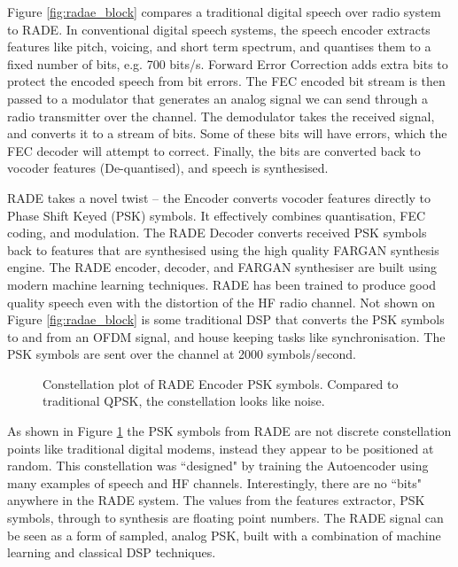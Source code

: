 \documentclass{article}
\begin{document}
Figure \ref{fig:radae_block} compares a traditional digital speech over radio system to RADE.
In conventional digital speech systems, the speech encoder extracts features like pitch, voicing, and short term spectrum, and quantises them to a fixed number of bits, e.g. 700 bits/s.  Forward Error Correction adds extra bits to protect the encoded speech from bit errors.  The FEC encoded bit stream is then passed to a modulator that generates an analog signal we can send through a radio transmitter over the channel.  The demodulator takes the received signal, and converts it to a stream of bits.  Some of these bits will have errors, which the FEC decoder will attempt to correct.  Finally, the bits are converted back to vocoder features (De-quantised), and speech is synthesised.

RADE takes a novel twist – the Encoder converts vocoder features directly to Phase Shift Keyed (PSK) symbols. It effectively combines quantisation, FEC coding, and modulation.  The RADE Decoder converts received PSK symbols back to features that are synthesised using the high quality FARGAN synthesis engine. The RADE encoder, decoder, and FARGAN synthesiser are built using modern machine learning techniques.  RADE has been trained to produce good quality speech even with the distortion of the HF radio channel. Not shown on Figure \ref{fig:radae_block} is some traditional DSP that converts the PSK symbols to and from an OFDM signal, and house keeping tasks like synchronisation. The PSK symbols are sent over the channel at 2000 symbols/second.

\begin{figure}[h]
\caption{Constellation plot of RADE Encoder PSK symbols.  Compared to traditional QPSK, the constellation looks like noise.}
\label{fig:psk_scatter}
\begin{center}

\end{center}
\end{figure}

As shown in Figure \ref{fig:psk_scatter} the PSK symbols from RADE are not discrete constellation points like traditional digital modems, instead they appear to be positioned at random.  This constellation was ``designed" by training the Autoencoder using many examples of speech and HF channels. Interestingly, there are no ``bits" anywhere in the RADE system.  The values from the features extractor, PSK symbols, through to synthesis are floating point numbers. The RADE signal can be seen as a form of sampled, analog PSK, built with a combination of machine learning and classical DSP techniques.
\end{document}
